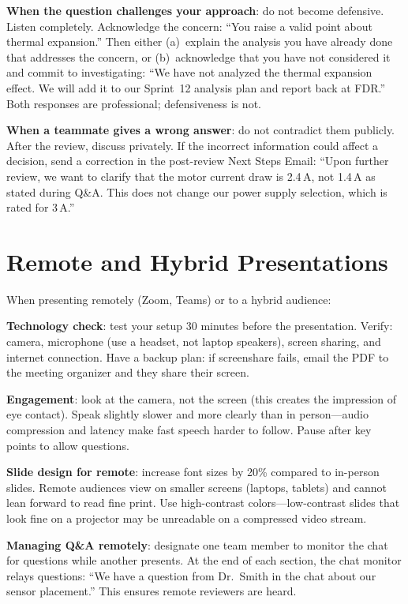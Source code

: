 \textbf{When the question challenges your approach}: do not become defensive. Listen completely. Acknowledge the concern: ``You raise a valid point about thermal expansion.'' Then either (a)~explain the analysis you have already done that addresses the concern, or (b)~acknowledge that you have not considered it and commit to investigating: ``We have not analyzed the thermal expansion effect. We will add it to our Sprint~12 analysis plan and report back at FDR.'' Both responses are professional; defensiveness is not.

\textbf{When a teammate gives a wrong answer}: do not contradict them publicly. After the review, discuss privately. If the incorrect information could affect a decision, send a correction in the post-review Next Steps Email: ``Upon further review, we want to clarify that the motor current draw is 2.4\,A, not 1.4\,A as stated during Q\&A. This does not change our power supply selection, which is rated for 3\,A.''

\section{Remote and Hybrid Presentations}
When presenting remotely (Zoom, Teams) or to a hybrid audience:

\textbf{Technology check}: test your setup 30 minutes before the presentation. Verify: camera, microphone (use a headset, not laptop speakers), screen sharing, and internet connection. Have a backup plan: if screenshare fails, email the PDF to the meeting organizer and they share their screen.

\textbf{Engagement}: look at the camera, not the screen (this creates the impression of eye contact). Speak slightly slower and more clearly than in person---audio compression and latency make fast speech harder to follow. Pause after key points to allow questions.

\textbf{Slide design for remote}: increase font sizes by 20\% compared to in-person slides. Remote audiences view on smaller screens (laptops, tablets) and cannot lean forward to read fine print. Use high-contrast colors---low-contrast slides that look fine on a projector may be unreadable on a compressed video stream.

\textbf{Managing Q\&A remotely}: designate one team member to monitor the chat for questions while another presents. At the end of each section, the chat monitor relays questions: ``We have a question from Dr.~Smith in the chat about our sensor placement.'' This ensures remote reviewers are heard.



